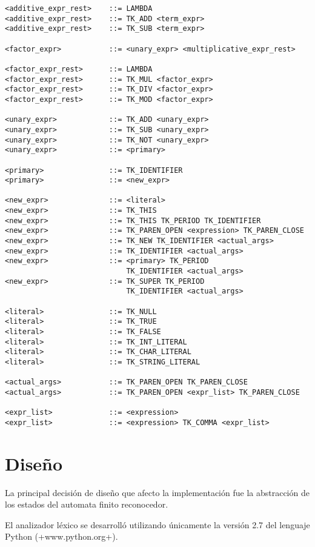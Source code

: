 \documentclass [a4paper,titlepage]{report}
\begin{document}
\begin{verbatim}
<additive_expr_rest>    ::= LAMBDA
<additive_expr_rest>    ::= TK_ADD <term_expr>
<additive_expr_rest>    ::= TK_SUB <term_expr>

<factor_expr>           ::= <unary_expr> <multiplicative_expr_rest>

<factor_expr_rest>      ::= LAMBDA
<factor_expr_rest>      ::= TK_MUL <factor_expr>
<factor_expr_rest>      ::= TK_DIV <factor_expr>
<factor_expr_rest>      ::= TK_MOD <factor_expr>

<unary_expr>            ::= TK_ADD <unary_expr>
<unary_expr>            ::= TK_SUB <unary_expr>
<unary_expr>            ::= TK_NOT <unary_expr>
<unary_expr>            ::= <primary>

<primary>               ::= TK_IDENTIFIER
<primary>               ::= <new_expr>

<new_expr>              ::= <literal>
<new_expr>              ::= TK_THIS
<new_expr>              ::= TK_THIS TK_PERIOD TK_IDENTIFIER
<new_expr>              ::= TK_PAREN_OPEN <expression> TK_PAREN_CLOSE
<new_expr>              ::= TK_NEW TK_IDENTIFIER <actual_args>
<new_expr>              ::= TK_IDENTIFIER <actual_args>
<new_expr>              ::= <primary> TK_PERIOD 
                            TK_IDENTIFIER <actual_args>
<new_expr>              ::= TK_SUPER TK_PERIOD 
                            TK_IDENTIFIER <actual_args>

<literal>               ::= TK_NULL
<literal>               ::= TK_TRUE
<literal>               ::= TK_FALSE
<literal>               ::= TK_INT_LITERAL
<literal>               ::= TK_CHAR_LITERAL
<literal>               ::= TK_STRING_LITERAL

<actual_args>           ::= TK_PAREN_OPEN TK_PAREN_CLOSE
<actual_args>           ::= TK_PAREN_OPEN <expr_list> TK_PAREN_CLOSE

<expr_list>             ::= <expression>
<expr_list>             ::= <expression> TK_COMMA <expr_list>
\end{verbatim}

\section{Diseño}

La principal decisión de diseño que afecto la implementación fue la
abstracción de los estados del automata finito reconocedor.

El analizador léxico se desarrolló utilizando únicamente la versión
2.7 del lenguaje Python (+www.python.org+).
\end{document}

